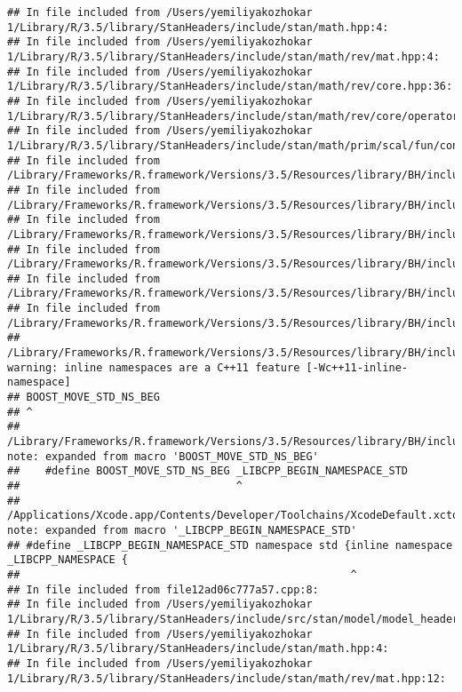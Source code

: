 \documentclass[]{article}
\begin{document}
\begin{verbatim}
## In file included from /Users/yemiliyakozhokar 1/Library/R/3.5/library/StanHeaders/include/stan/math.hpp:4:
## In file included from /Users/yemiliyakozhokar 1/Library/R/3.5/library/StanHeaders/include/stan/math/rev/mat.hpp:4:
## In file included from /Users/yemiliyakozhokar 1/Library/R/3.5/library/StanHeaders/include/stan/math/rev/core.hpp:36:
## In file included from /Users/yemiliyakozhokar 1/Library/R/3.5/library/StanHeaders/include/stan/math/rev/core/operator_unary_plus.hpp:7:
## In file included from /Users/yemiliyakozhokar 1/Library/R/3.5/library/StanHeaders/include/stan/math/prim/scal/fun/constants.hpp:4:
## In file included from /Library/Frameworks/R.framework/Versions/3.5/Resources/library/BH/include/boost/math/constants/constants.hpp:13:
## In file included from /Library/Frameworks/R.framework/Versions/3.5/Resources/library/BH/include/boost/math/tools/convert_from_string.hpp:15:
## In file included from /Library/Frameworks/R.framework/Versions/3.5/Resources/library/BH/include/boost/lexical_cast.hpp:32:
## In file included from /Library/Frameworks/R.framework/Versions/3.5/Resources/library/BH/include/boost/lexical_cast/try_lexical_convert.hpp:42:
## In file included from /Library/Frameworks/R.framework/Versions/3.5/Resources/library/BH/include/boost/lexical_cast/detail/converter_lexical.hpp:52:
## In file included from /Library/Frameworks/R.framework/Versions/3.5/Resources/library/BH/include/boost/container/container_fwd.hpp:61:
## /Library/Frameworks/R.framework/Versions/3.5/Resources/library/BH/include/boost/container/detail/std_fwd.hpp:27:1: warning: inline namespaces are a C++11 feature [-Wc++11-inline-namespace]
## BOOST_MOVE_STD_NS_BEG
## ^
## /Library/Frameworks/R.framework/Versions/3.5/Resources/library/BH/include/boost/move/detail/std_ns_begin.hpp:18:34: note: expanded from macro 'BOOST_MOVE_STD_NS_BEG'
##    #define BOOST_MOVE_STD_NS_BEG _LIBCPP_BEGIN_NAMESPACE_STD
##                                  ^
## /Applications/Xcode.app/Contents/Developer/Toolchains/XcodeDefault.xctoolchain/usr/include/c++/v1/__config:390:52: note: expanded from macro '_LIBCPP_BEGIN_NAMESPACE_STD'
## #define _LIBCPP_BEGIN_NAMESPACE_STD namespace std {inline namespace _LIBCPP_NAMESPACE {
##                                                    ^
## In file included from file12ad06c777a57.cpp:8:
## In file included from /Users/yemiliyakozhokar 1/Library/R/3.5/library/StanHeaders/include/src/stan/model/model_header.hpp:4:
## In file included from /Users/yemiliyakozhokar 1/Library/R/3.5/library/StanHeaders/include/stan/math.hpp:4:
## In file included from /Users/yemiliyakozhokar 1/Library/R/3.5/library/StanHeaders/include/stan/math/rev/mat.hpp:12:

\end{verbatim}
\end{document}
